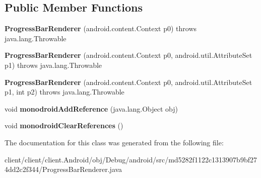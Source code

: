 \subsection*{Public Member Functions}
\begin{DoxyCompactItemize}
\item 
\hypertarget{classmd5282f1122c1313907b9bf274dd2c2f344_1_1ProgressBarRenderer_ab69a398520162cf2bf56a5b527bc43a8}{}{\bfseries Progress\+Bar\+Renderer} (android.\+content.\+Context p0)  throws java.\+lang.\+Throwable 	\label{classmd5282f1122c1313907b9bf274dd2c2f344_1_1ProgressBarRenderer_ab69a398520162cf2bf56a5b527bc43a8}

\item 
\hypertarget{classmd5282f1122c1313907b9bf274dd2c2f344_1_1ProgressBarRenderer_a382e747a4fc35a1ebada39b262e52658}{}{\bfseries Progress\+Bar\+Renderer} (android.\+content.\+Context p0, android.\+util.\+Attribute\+Set p1)  throws java.\+lang.\+Throwable 	\label{classmd5282f1122c1313907b9bf274dd2c2f344_1_1ProgressBarRenderer_a382e747a4fc35a1ebada39b262e52658}

\item 
\hypertarget{classmd5282f1122c1313907b9bf274dd2c2f344_1_1ProgressBarRenderer_aa463857c0b15f939220ffbbccab50a86}{}{\bfseries Progress\+Bar\+Renderer} (android.\+content.\+Context p0, android.\+util.\+Attribute\+Set p1, int p2)  throws java.\+lang.\+Throwable 	\label{classmd5282f1122c1313907b9bf274dd2c2f344_1_1ProgressBarRenderer_aa463857c0b15f939220ffbbccab50a86}

\item 
\hypertarget{classmd5282f1122c1313907b9bf274dd2c2f344_1_1ProgressBarRenderer_ab9cbe9e239cdec0ed7e14236e15d6199}{}void {\bfseries monodroid\+Add\+Reference} (java.\+lang.\+Object obj)\label{classmd5282f1122c1313907b9bf274dd2c2f344_1_1ProgressBarRenderer_ab9cbe9e239cdec0ed7e14236e15d6199}

\item 
\hypertarget{classmd5282f1122c1313907b9bf274dd2c2f344_1_1ProgressBarRenderer_a57a00a59867427ed2e923e2ac1313cc6}{}void {\bfseries monodroid\+Clear\+References} ()\label{classmd5282f1122c1313907b9bf274dd2c2f344_1_1ProgressBarRenderer_a57a00a59867427ed2e923e2ac1313cc6}

\end{DoxyCompactItemize}


The documentation for this class was generated from the following file\+:\begin{DoxyCompactItemize}
\item 
client/client/client.\+Android/obj/\+Debug/android/src/md5282f1122c1313907b9bf274dd2c2f344/Progress\+Bar\+Renderer.\+java\end{DoxyCompactItemize}
